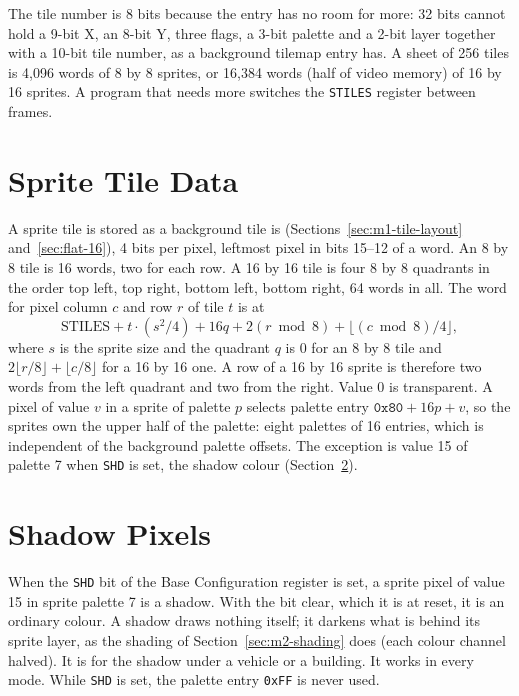 The tile number is 8 bits because the entry has no room for more: 32 bits cannot hold a 9-bit X, an 8-bit Y, three
flags, a 3-bit palette and a 2-bit layer together with a 10-bit tile number, as a background tilemap entry has. A sheet
of 256 tiles is 4,096 words of 8 by 8 sprites, or 16,384 words (half of video memory) of 16 by 16 sprites. A program
that needs more switches the \texttt{STILES} register between frames.

\section{Sprite Tile Data}

A sprite tile is stored as a background tile is (Sections~\ref{sec:m1-tile-layout} and~\ref{sec:flat-16}), 4 bits per
pixel, leftmost pixel in bits 15--12 of a word. An 8 by 8 tile is 16 words, two for each row. A 16 by 16 tile is four 8
by 8 quadrants in the order top left, top right, bottom left, bottom right, 64 words in all. The word for pixel column
$c$ and row $r$ of tile $t$ is at
\[
	\text{STILES} + t \cdot (s^2/4) + 16 q + 2 (r \bmod 8) + \lfloor (c \bmod 8)/4 \rfloor ,
\]
where $s$ is the sprite size and the quadrant $q$ is $0$ for an 8 by 8 tile and $2\lfloor r/8 \rfloor + \lfloor c/8
	\rfloor$ for a 16 by 16 one. A row of a 16 by 16 sprite is therefore two words from the left quadrant and two from the
right. Value 0 is transparent. A pixel of value $v$ in a sprite of palette $p$ selects palette entry $\texttt{0x80} +
	16p + v$, so the sprites own the upper half of the palette: eight palettes of 16 entries, which is independent of the
background palette offsets. The exception is value 15 of palette 7 when \texttt{SHD} is set, the shadow colour
(Section~\ref{sec:sprite-shadow}).

\section{Shadow Pixels}
\label{sec:sprite-shadow}

When the \texttt{SHD} bit of the Base Configuration register is set, a sprite pixel of value 15 in sprite palette 7 is
a shadow. With the bit clear, which it is at reset, it is an ordinary colour. A shadow draws nothing itself; it darkens
what is behind its sprite layer, as the shading of Section~\ref{sec:m2-shading} does (each colour channel halved). It
is for the shadow under a vehicle or a building. It works in every mode. While \texttt{SHD} is set, the palette entry
\texttt{0xFF} is never used.

